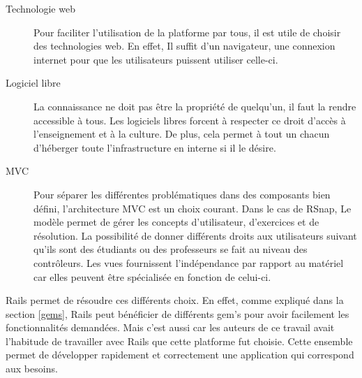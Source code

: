 \begin{description}
  \item[Technologie web] Pour faciliter l'utilisation de la platforme par tous, il est utile de choisir des technologies web. En effet, Il suffit d'un navigateur, une connexion internet pour que les utilisateurs puissent utiliser celle-ci.
  \item[Logiciel libre] La connaissance ne doit pas être la propriété de quelqu'un, il faut la rendre accessible à tous. Les logiciels libres forcent à respecter ce droit d'accès à l'enseignement et à la culture. De plus, cela permet à tout un chacun d'héberger toute l'infrastructure en interne si il le désire.
  \item[MVC] Pour séparer les différentes problématiques dans des composants bien défini, l'architecture MVC est un choix courant. Dans le cas de RSnap, Le modèle permet de gérer les concepts d'utilisateur, d'exercices et de résolution. La possibilité de donner différents droits aux utilisateurs suivant qu'ils sont des étudiants ou des professeurs se fait au niveau des contrôleurs. Les vues fournissent l'indépendance par rapport au matériel car elles peuvent être spécialisée en fonction de celui-ci.
\end{description}
Rails permet de résoudre ces différents choix. %
En effet, comme expliqué dans la section \ref{gems}, Rails peut bénéficier de différents gem's pour avoir facilement les fonctionnalités demandées. Mais c'est aussi car les auteurs de ce travail avait l'habitude de travailler avec Rails que cette platforme fut choisie. Cette ensemble permet de développer rapidement et correctement une application qui correspond aux besoins. 


